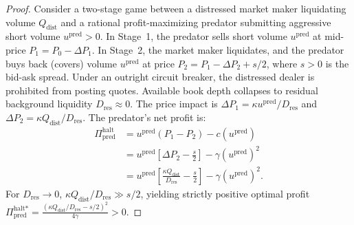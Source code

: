 \documentclass[11pt,a4paper]{article}
\theoremstyle{definition}\newtheorem{definition}[theorem]{Definition}
\theoremstyle{remark}\newtheorem{remark}[theorem]{Remark}
\begin{document}
\begin{proof}
Consider a two-stage game between a distressed market maker liquidating volume $Q_{\text{dist}}$ and a rational profit-maximizing predator submitting aggressive short volume $u^{\text{pred}} > 0$.
In Stage~1, the predator sells short volume $u^{\text{pred}}$ at mid-price $P_1 = P_0 - \Delta P_1$. In Stage~2, the market maker liquidates, and the predator buys back (covers) volume $u^{\text{pred}}$ at price $P_2 = P_1 - \Delta P_2 + s/2$, where $s > 0$ is the bid-ask spread.
Under an outright circuit breaker, the distressed dealer is prohibited from posting quotes. Available book depth collapses to residual background liquidity $D_{\text{res}} \approx 0$. The price impact is $\Delta P_1 = \kappa u^{\text{pred}} / D_{\text{res}}$ and $\Delta P_2 = \kappa Q_{\text{dist}} / D_{\text{res}}$. The predator's net profit is:
\begin{align}
\Pi_{\text{pred}}^{\text{halt}} &= u^{\text{pred}} (P_1 - P_2) - c(u^{\text{pred}}) \nonumber\\
&= u^{\text{pred}} \left[ \Delta P_2 - \frac{s}{2} \right] - \gamma (u^{\text{pred}})^2 \nonumber\\
&= u^{\text{pred}} \left[ \frac{\kappa Q_{\text{dist}}}{D_{\text{res}}} - \frac{s}{2} \right] - \gamma (u^{\text{pred}})^2.
\end{align}
For $D_{\text{res}} \to 0$, $\kappa Q_{\text{dist}} / D_{\text{res}} \gg s/2$, yielding strictly positive optimal profit $\Pi_{\text{pred}}^{\text{halt}*} = \frac{(\kappa Q_{\text{dist}}/D_{\text{res}} - s/2)^2}{4\gamma} > 0$.


\end{proof}
\end{document}
